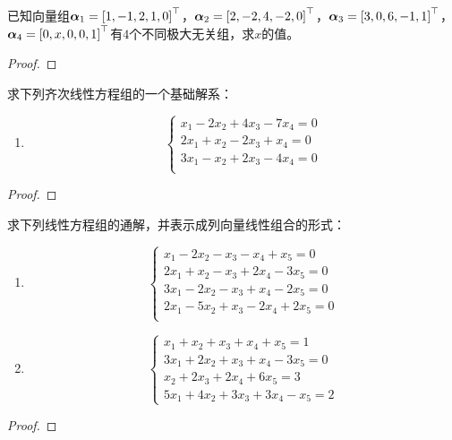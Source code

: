\begin{problem}
已知向量组\(\boldsymbol{\alpha}_1=\left[ 1,-1,2,1,0 \right]^\top\)，\(\boldsymbol{\alpha}_2=\left[ 2,-2,4,-2,0 \right]^\top\)，\(\boldsymbol{\alpha}_3=\left[ 3,0,6,-1,1 \right]^\top\)，\(\boldsymbol{\alpha}_4=\left[ 0,x,0,0,1 \right]^\top\)有\(4\)个不同极大无关组，求\(x\)的值。
\end{problem}
\begin{proof}

\end{proof}

\begin{problem}
求下列齐次线性方程组的一个基础解系：
\begin{enumerate}
    \item
          {
          \begin{equation*}
              \begin{cases}
                  x_1-2x_2+4x_3-7x_4=0 \\
                  2x_1+x_2-2x_3+x_4=0  \\
                  3x_1-x_2+2x_3-4x_4=0 \\
              \end{cases}
          \end{equation*}
          }
\end{enumerate}
\end{problem}
\begin{proof}

\end{proof}

\begin{problem}
求下列线性方程组的通解，并表示成列向量线性组合的形式：
\begin{enumerate}
    \item
          {
          \begin{equation*}
              \begin{cases}
                  x_1-2x_2-x_3-x_4+x_5=0    \\
                  2x_1+x_2-x_3+2x_4-3x_5=0  \\
                  3x_1-2x_2-x_3+x_4-2x_5=0  \\
                  2x_1-5x_2+x_3-2x_4+2x_5=0 \\
              \end{cases}
          \end{equation*}
          }
    \item \begin{equation*}
              \begin{cases}
                  x_1+x_2+x_3+x_4+x_5=1    \\
                  3x_1+2x_2+x_3+x_4-3x_5=0 \\
                  x_2+2x_3+2x_4+6x_5=3     \\
                  5x_1+4x_2+3x_3+3x_4-x_5=2
              \end{cases}
          \end{equation*}
\end{enumerate}
\end{problem}
\begin{proof}

\end{proof}

